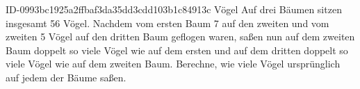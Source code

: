 \begin{exercise}
      {ID-0993bc1925a2ffbaf3da35dd3cdd103b1c84913c}
      {Vögel}
  \ifproblem\problem
    Auf drei Bäumen sitzen insgesamt 56 Vögel. Nachdem vom ersten Baum 7 auf
    den zweiten und vom zweiten 5 Vögel auf den dritten Baum geflogen waren,
    saßen nun auf dem zweiten Baum doppelt so viele Vögel wie auf dem ersten
    und auf dem dritten doppelt so viele Vögel wie auf dem zweiten Baum.
    Berechne, wie viele Vögel ursprünglich auf jedem der Bäume saßen.
  \fi
\end{exercise}
